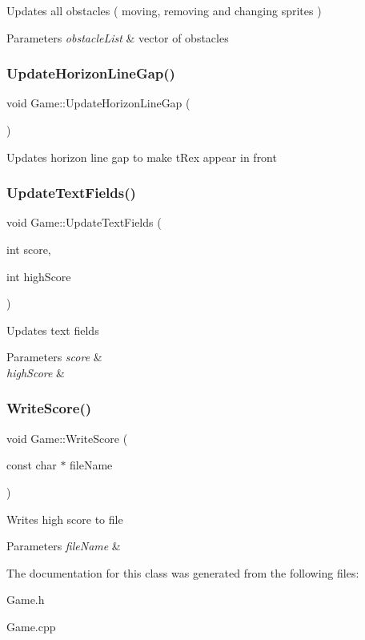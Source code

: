 Updates all obstacles ( moving, removing and changing sprites ) 
\begin{DoxyParams}{Parameters}
{\em obstacle\+List} & vector of obstacles \\
\hline
\end{DoxyParams}
\mbox{\label{class_game_a11973be88ac6d1d31d32267e31917901}} 
\subsubsection{\texorpdfstring{Update\+Horizon\+Line\+Gap()}{UpdateHorizonLineGap()}}
{\footnotesize\ttfamily void Game\+::\+Update\+Horizon\+Line\+Gap (\begin{DoxyParamCaption}{ }\end{DoxyParamCaption})}

Updates horizon line gap to make t\+Rex appear in front \mbox{\label{class_game_aace69a639001358fe49feea1018d3d0b}} 
\subsubsection{\texorpdfstring{Update\+Text\+Fields()}{UpdateTextFields()}}
{\footnotesize\ttfamily void Game\+::\+Update\+Text\+Fields (\begin{DoxyParamCaption}\item[{int}]{score,  }\item[{int}]{high\+Score }\end{DoxyParamCaption})}

Updates text fields 
\begin{DoxyParams}{Parameters}
{\em score} & \\
\hline
{\em high\+Score} & \\
\hline
\end{DoxyParams}
\mbox{\label{class_game_ae59d28483bdb8b832186dc70f2ebc6a8}} 
\subsubsection{\texorpdfstring{Write\+Score()}{WriteScore()}}
{\footnotesize\ttfamily void Game\+::\+Write\+Score (\begin{DoxyParamCaption}\item[{const char $\ast$}]{file\+Name }\end{DoxyParamCaption})}

Writes high score to file 
\begin{DoxyParams}{Parameters}
{\em file\+Name} & \\
\hline
\end{DoxyParams}


The documentation for this class was generated from the following files\+:\begin{DoxyCompactItemize}
\item 
Game.\+h\item 
Game.\+cpp\end{DoxyCompactItemize}
